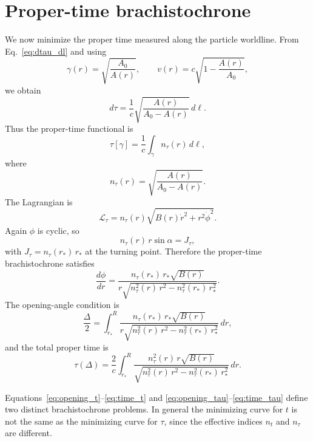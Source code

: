 \documentclass[
  aps,
  prd,
  twocolumn,
  nofootinbib,
  superscriptaddress,
  longbibliography
]{revtex4-2}
\begin{document}
\section{Proper-time brachistochrone}

We now minimize the proper time measured along the particle worldline.
From Eq.~\eqref{eq:dtau_dl} and using
\begin{equation}
\gamma(r)=\sqrt{\frac{A_0}{A(r)}},
\qquad
v(r)=c\sqrt{1-\frac{A(r)}{A_0}},
\end{equation}
we obtain
\begin{equation}
d\tau
=
\frac{1}{c}
\sqrt{
\frac{A(r)}{A_0-A(r)}
}
\,d\ell.
\end{equation}
Thus the proper-time functional is
\begin{equation}
\tau[\gamma]
=
\frac{1}{c}
\int_\gamma
n_\tau(r)\,d\ell,
\label{eq:tau_functional}
\end{equation}
where
\begin{equation}
n_\tau(r)
=
\sqrt{
\frac{A(r)}{A_0-A(r)}
}.
\label{eq:ntau_def}
\end{equation}
The Lagrangian is
\begin{equation}
\mathcal{L}_\tau
=
n_\tau(r)
\sqrt{
B(r)\dot{r}^2+r^2\dot{\phi}^2
}.
\end{equation}
Again $\phi$ is cyclic, so
\begin{equation}
n_\tau(r)\,r\sin\alpha
=
J_\tau,
\label{eq:snell_tau}
\end{equation}
with $J_\tau = n_\tau(r_*)\,r_*$ at the turning point. Therefore
the proper-time brachistochrone satisfies
\begin{equation}
\frac{d\phi}{dr}
=
\frac{
n_\tau(r_*)\,r_*\sqrt{B(r)}
}{
r\sqrt{
n_\tau^2(r)\,r^2
-
n_\tau^2(r_*)\,r_*^2
}
}.
\label{eq:dphidr_tau}
\end{equation}
The opening-angle condition is
\begin{equation}
\frac{\Delta}{2}
=
\int_{r_*}^{R}
\frac{
n_\tau(r_*)\,r_*\sqrt{B(r)}
}{
r\sqrt{
n_\tau^2(r)\,r^2
-
n_\tau^2(r_*)\,r_*^2
}
}
\,dr,
\label{eq:opening_tau}
\end{equation}
and the total proper time is
\begin{equation}
\tau(\Delta)
=
\frac{2}{c}
\int_{r_*}^{R}
\frac{
n_\tau^2(r)\,r\sqrt{B(r)}
}{
\sqrt{
n_\tau^2(r)\,r^2
-
n_\tau^2(r_*)\,r_*^2
}
}
\,dr.
\label{eq:time_tau}
\end{equation}

Equations~\eqref{eq:opening_t}--\eqref{eq:time_t} and
\eqref{eq:opening_tau}--\eqref{eq:time_tau} define two distinct
brachistochrone problems. In general the minimizing curve for $t$ is
not the same as the minimizing curve for $\tau$, since the effective
indices $n_t$ and $n_\tau$ are different.
\end{document}
